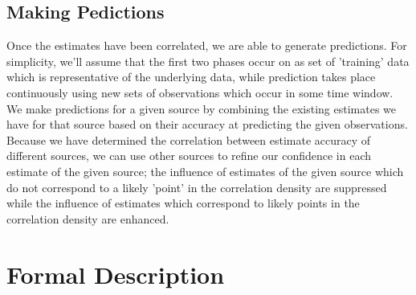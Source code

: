 \documentclass[10pt]{article}
\begin{document}
\subsection{Making Pedictions}
Once the estimates have been correlated, we are able to generate predictions.  For simplicity, we'll assume that the first two phases occur on as set of 'training' data which is representative of the underlying data, while prediction takes place continuously using new sets of observations which occur in some time window.  We make predictions for a given source by combining the existing estimates we have for that source based on their accuracy at predicting the given observations.  Because we have determined the correlation between estimate accuracy of different sources, we can use other sources to refine our confidence in each estimate of the given source; the influence of estimates of the given source which do not correspond to a likely 'point' in the correlation density are suppressed while the influence of estimates which correspond to likely points in the correlation density are enhanced.

\section{Formal Description}


\end{document}
